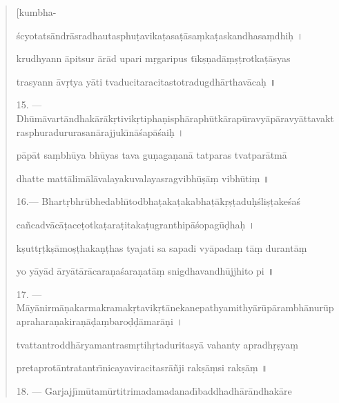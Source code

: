 \documentclass[a4paper, 11pt, oneside, french]{article}
\begin{document}
\begin{quotation}
\hspace*{25mm}[kumbha-

\'{s}cyotats\={a}ndr\={a}sradhautasphu\d{t}avika\d{t}asa\d{t}\={a}sa\d{m}ka\d{t}askandhasa\d{m}dhi\d{h} \texthindi{।}

krudhyann \={a}pitsur \={a}r\={a}d upari m\d{r}garipus t\={\i}k\d{s}\d{n}ad\={a}\d{m}\d{s}\d{t}rotka\d{t}\={a}syas

trasyann \={a}v\d{r}tya y\={a}ti tvaducitaracitastotradugdh\={a}rthav\={a}ca\d{h} \texthindi{॥}

\bigskip

15. --- Dh\={u}m\={a}vart\={a}ndhak\={a}r\={a}k\d{r}tivik\d{r}tipha\d{n}isph\={a}raph\={u}tk\={a}rap\={u}ravy\={a}p\={a}ravy\={a}ttavaktrasphuradururasan\={a}rajjuk\={\i}n\={a}\'{s}ap\={a}\'{s}ai\d{h} \texthindi{।}

p\={a}p\={a}t sa\d{m}bh\={u}ya bh\={u}yas tava gu\d{n}aga\d{n}an\={a} tatparas tvatpar\={a}tm\={a}

dhatte matt\={a}lim\={a}l\={a}valayakuvalayasragvibh\={u}\d{s}\={a}\d{m} vibh\={u}ti\d{m} \texthindi{॥}

\bigskip

16.--- Bhart\d{r}bhr\={u}bhedabh\={\i}todbha\d{t}aka\d{t}akabha\d{t}\={a}k\d{r}\d{s}\d{t}adu\d{h}\'{s}li\d{s}\d{t}ake\'{s}a\'{s}

ca\~{n}cadv\={a}c\={a}\d{t}ace\d{t}otka\d{t}ara\d{t}itaka\d{t}ugranthip\={a}\'{s}opag\={u}\d{d}ha\d{h} \texthindi{।}

k\d{s}utt\d{r}\d{t}k\d{s}\={a}mo\d{s}\d{t}haka\d{n}\d{t}has tyajati sa sapadi vy\={a}pada\d{m} t\={a}\d{m} durant\={a}\d{m}

yo y\={a}y\={a}d \={a}ry\={a}t\={a}r\={a}cara\d{n}a\'{s}ara\d{n}at\={a}\d{m} snigdhavandh\={u}jjhito pi \texthindi{॥}

\bigskip

17. --- M\={a}y\={a}nirm\={a}\d{n}akarmakramak\d{r}tavik\d{r}t\={a}nekanepathyamithy\={a}r\={u}p\={a}rambh\={a}nur\={u}paprahara\d{n}akira\d{n}\={a}\d{d}a\d{m}baro\d{d}\d{d}\={a}mar\={a}\d{n}i \texthindi{।}

tvattantroddh\={a}ryamantrasm\d{r}tih\d{r}taduritasy\={a} vahanty apradh\d{r}\d{s}ya\d{m}

pretaprot\={a}ntratantr\={\i}nicayaviracitasr\={a}\~{n}ji rak\d{s}\={a}\d{m}si rak\d{s}\={a}\d{m} \texthindi{॥}

\bigskip

18. --- Garjajj\={\i}m\={u}tam\={u}rtitrimadamadanad\={\i}baddhadh\={a}r\={a}ndhak\={a}re


\end{quotation}
\end{document}
